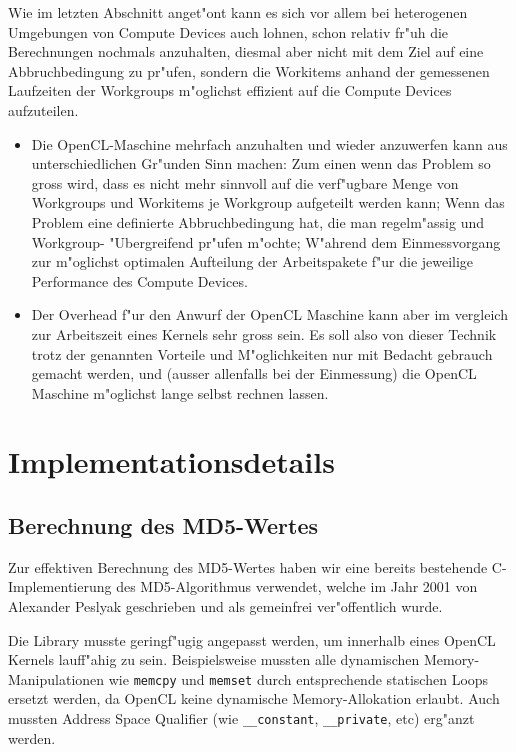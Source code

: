 \begin{refsection}
Wie im letzten Abschnitt anget"ont kann es sich vor allem bei heterogenen 
Umgebungen von Compute Devices auch lohnen, schon relativ fr"uh die 
Berechnungen nochmals anzuhalten, diesmal aber nicht mit dem Ziel auf eine
Abbruchbedingung zu pr"ufen, sondern die Workitems anhand der gemessenen
Laufzeiten der Workgroups m"oglichst effizient auf die Compute Devices
aufzuteilen.

\begin{itemize}
 \item Die OpenCL-Maschine mehrfach anzuhalten und wieder anzuwerfen 
       kann aus unterschiedlichen Gr"unden Sinn machen: Zum einen
       wenn das Problem so gross wird, dass es nicht mehr sinnvoll auf 
       die verf"ugbare Menge von Workgroups und Workitems je Workgroup
       aufgeteilt werden kann; Wenn das Problem eine definierte 
       Abbruchbedingung hat, die man regelm"assig und Workgroup-
       "Ubergreifend pr"ufen m"ochte; W"ahrend dem Einmessvorgang
       zur m"oglichst optimalen Aufteilung der Arbeitspakete f"ur die 
       jeweilige Performance des Compute Devices.
 \item Der Overhead f"ur den Anwurf der OpenCL Maschine kann aber im 
       vergleich zur Arbeitszeit eines Kernels sehr gross sein. Es soll
       also von dieser Technik trotz der genannten Vorteile und 
       M"oglichkeiten nur mit Bedacht gebrauch gemacht werden, und 
       (ausser allenfalls bei der Einmessung) die OpenCL Maschine
       m"oglichst lange selbst rechnen lassen.
\end{itemize}


\section{Implementationsdetails}

\subsection{Berechnung des MD5-Wertes}
\label{crypto:md5lib}

Zur effektiven Berechnung des MD5-Wertes haben wir eine bereits bestehende
C-Implementierung des MD5-Algorithmus verwendet\cite{crypto:md5_impl}, welche im
Jahr 2001 von Alexander Peslyak geschrieben und als gemeinfrei ver"offentlich
wurde.

Die Library musste geringf"ugig angepasst werden, um innerhalb eines OpenCL
Kernels lauff"ahig zu sein. Beispielsweise mussten alle dynamischen
Memory-Manipulationen wie \texttt{memcpy} und \texttt{memset} durch
entsprechende statischen Loops ersetzt werden, da OpenCL keine dynamische
Memory-Al\-lo\-ka\-ti\-on erlaubt. Auch mussten Address Space Qualifier (wie
\texttt{\_\_constant}, \texttt{\_\_private}, etc) erg"anzt werden.


\end{refsection}
